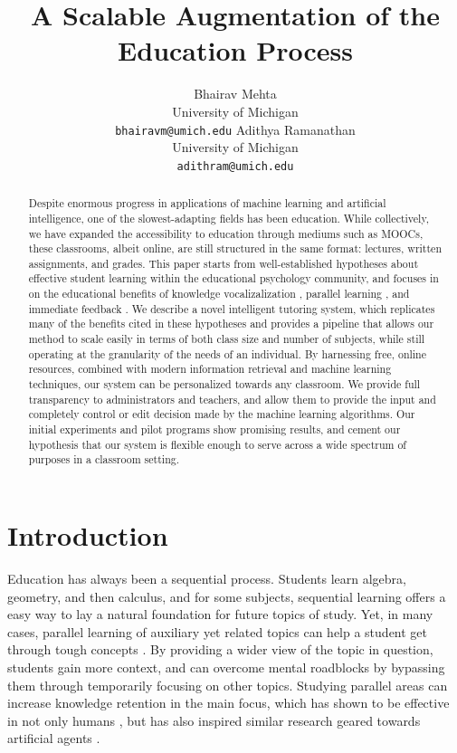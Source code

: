 \documentclass[11pt,a4paper]{article}
\title{A Scalable Augmentation of the Education Process}
\author{Bhairav Mehta \\
  University of Michigan \\
  {\tt bhairavm@umich.edu}
  \And
  Adithya Ramanathan \\
  University of Michigan \\
  {\tt adithram@umich.edu}}
\date{}
\begin{document}
\maketitle
\begin{abstract}
  Despite enormous progress in applications of machine learning and artificial intelligence, one of the slowest-adapting fields has been education. While collectively, we have expanded the accessibility to education through mediums such as MOOCs, these classrooms, albeit online, are still structured in the same format: lectures, written assignments, and grades. This paper starts from well-established hypotheses about effective student learning within the educational psychology community, and focuses in on the educational benefits of knowledge vocalizalization \cite{TODO}, parallel learning \cite{TODO}, and immediate feedback \cite{TODO}. We describe a novel intelligent tutoring system, which replicates many of the benefits cited in these hypotheses and provides a pipeline that allows our method to scale easily in terms of both class size and number of subjects, while still operating at the granularity of the needs of an individual. By harnessing free, online resources, combined with modern information retrieval and machine learning techniques, our system can be personalized towards any classroom. We provide full transparency to administrators and teachers, and allow them to provide the input and completely control or edit  decision made by the machine learning algorithms. Our initial experiments and pilot programs show promising results, and cement our hypothesis that our system is flexible enough to serve across a wide spectrum of purposes in a classroom setting.
\end{abstract}

\section{Introduction}

Education has always been a sequential process. Students learn algebra, geometry, and then calculus, and for some subjects, sequential learning offers a easy way to lay a natural foundation for future topics of study. Yet, in many cases, parallel learning of auxiliary yet related topics can help a student get through tough concepts \cite{TODO}. By providing a wider view of the topic in question, students gain more context, and can overcome mental roadblocks by bypassing them through temporarily focusing on other topics. Studying parallel areas can increase knowledge retention in the main focus, which has shown to be effective in not only humans \cite{TODO}, but has also inspired similar research geared towards artificial agents \cite{TODO}.
\end{document}
